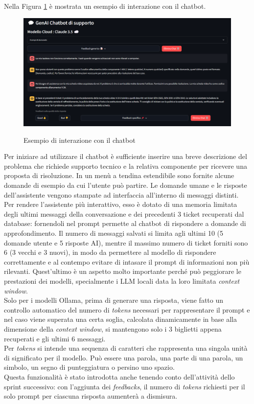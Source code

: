 Nella Figura \ref{fig:conversation_example} è mostrata un esempio di interazione con il chatbot.
\begin{figure}[H]
    \centering
    \includegraphics[alt={Esempio di interazione con il chatbot}, width=1\columnwidth]{img/chatExample.png}
    \caption{Esempio di interazione con il chatbot}
    \label{fig:conversation_example}
\end{figure}

Per iniziare ad utilizzare il chatbot è sufficiente inserire una breve descrizione del problema che richiede supporto tecnico e la relativa componente per ricevere una proposta di risoluzione.
In un menù a tendina estendibile sono fornite alcune domande di esempio da cui l'utente può partire.
Le domande umane e le risposte dell'assistente vengono stampate ad interfaccia all'interno di messaggi distinti.\\
Per rendere l'assistente più interattivo, esso è dotato di una memoria limitata degli ultimi messaggi della conversazione e dei precedenti 3 ticket recuperati dal database:
fornendoli nel prompt permette al chatbot di rispondere a domande di approfondimento. 
Il numero di messaggi salvati si limita agli ultimi 10 (5 domande utente e 5 risposte AI), mentre il massimo numero di ticket forniti sono 6 (3 vecchi e 3 nuovi), in modo da permettere al modello di rispondere correttamente e al contempo evitare di intasare il prompt di informazioni non più rilevanti. 
Quest'ultimo è un aspetto molto importante perché può peggiorare le prestazioni dei modelli, specialmente i LLM locali data la loro limitata \textit{context window}.\\
Solo per i modelli Ollama, prima di generare una risposta, viene fatto un controllo automatico del numero di \textit{tokens} necessari per rappresentare il prompt e nel caso viene superata una certa soglia, calcolata dinamicamente in base alla dimensione della \textit{context window}, 
si mantengono solo i 3 biglietti appena recuperati e gli ultimi 6 messaggi.\\
Per \textit{tokens} si intende una sequenza di caratteri che rappresenta una singola unità di significato per il modello. Può essere una parola, una parte di una parola, un simbolo, un segno di punteggiatura o persino uno spazio. \\
Questa funzionalità è stato introdotta anche tenendo conto dell'attività dello sprint successivo: 
con l'aggiunta dei \textit{feedbacks}, il numero di \textit{tokens} richiesti per il solo prompt per ciascuna risposta aumenterà a dismisura.

